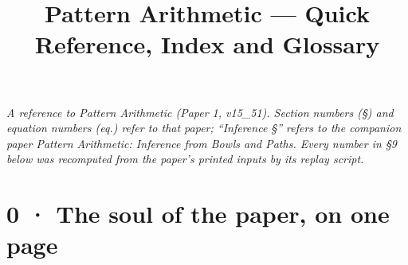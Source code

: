 \documentclass[10.5pt]{article}
\title{Pattern Arithmetic — Quick Reference, Index and Glossary}
\date{}
\begin{document}
\maketitle
\vspace{-2.4em}
\begin{center}
\small\emph{A reference to \emph{Pattern Arithmetic} (Paper 1, v15\_51). Section numbers (§) and equation numbers (eq.) refer to that paper; ``Inference §'' refers to the companion paper \emph{Pattern Arithmetic: Inference from Bowls and Paths}. Every number in §9 below was recomputed from the paper's printed inputs by its replay script.}
\end{center}
\vspace{0.4em}
\section*{0 · The soul of the paper, on one page}
\end{document}
